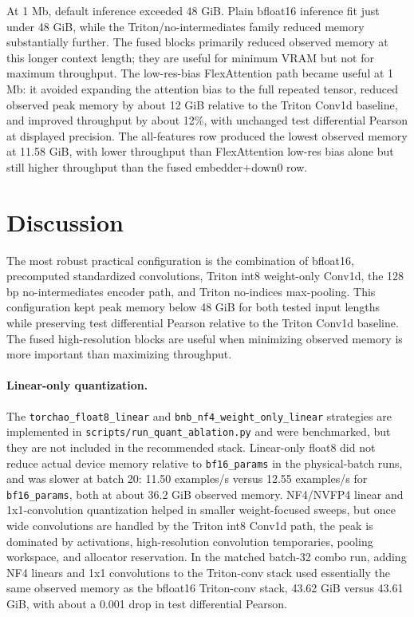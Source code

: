 \documentclass[11pt]{article}
\begin{document}
At 1 Mb, default inference exceeded 48 GiB. Plain bfloat16 inference fit just
under 48 GiB, while the Triton/no-intermediates family reduced memory
substantially further. The fused blocks primarily reduced observed memory at
this longer context length; they are useful for minimum VRAM but not for maximum
throughput. The low-res-bias FlexAttention path became useful at 1 Mb: it
avoided expanding the attention bias to the full repeated tensor, reduced
observed peak memory by about 12 GiB relative to the Triton Conv1d baseline, and
improved throughput by about 12\%, with unchanged test differential Pearson at
displayed precision. The all-features row produced the lowest observed memory
at 11.58 GiB, with lower throughput than FlexAttention low-res bias alone but
still higher throughput than the fused embedder+down0 row.

\section{Discussion}

The most robust practical configuration is the combination of bfloat16,
precomputed standardized convolutions, Triton int8 weight-only Conv1d, the
128 bp no-intermediates encoder path, and Triton no-indices max-pooling. This
configuration kept peak memory below 48 GiB for both tested input lengths while
preserving test differential Pearson relative to the Triton Conv1d baseline. The
fused high-resolution blocks are useful when minimizing observed memory is more
important than maximizing throughput.

\paragraph{Linear-only quantization.}
The \texttt{torchao\_float8\_linear} and
\texttt{bnb\_nf4\_weight\_only\_linear} strategies are implemented in
\texttt{scripts/run\_quant\_ablation.py} and were benchmarked, but they are not
included in the recommended stack. Linear-only float8 did not reduce actual
device memory relative to \texttt{bf16\_params} in the physical-batch runs, and
was slower at batch 20: 11.50 examples/s versus 12.55 examples/s for
\texttt{bf16\_params}, both at about 36.2 GiB observed memory. NF4/NVFP4 linear
and 1x1-convolution quantization helped in smaller weight-focused sweeps, but
once wide convolutions are handled by the Triton int8 Conv1d path, the peak is
dominated by activations, high-resolution convolution temporaries, pooling
workspace, and allocator reservation. In the matched batch-32 combo run, adding
NF4 linears and 1x1 convolutions to the Triton-conv stack used essentially the
same observed memory as the bfloat16 Triton-conv stack, 43.62 GiB versus
43.61 GiB, with about a 0.001 drop in test differential Pearson.
\end{document}
